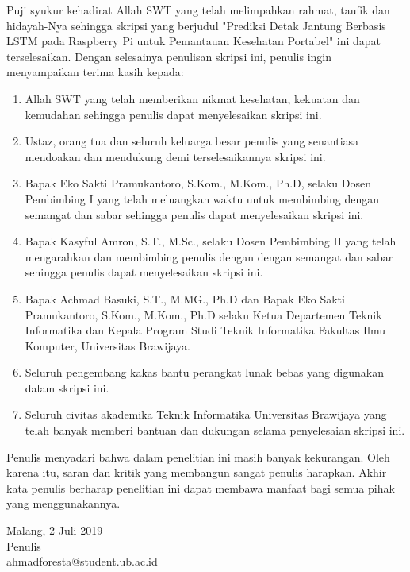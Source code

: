 \documentclass{skripsi}
\begin{document}
{\preface

  Puji syukur kehadirat Allah SWT yang telah melimpahkan rahmat,
  taufik dan hidayah-Nya sehingga skripsi yang berjudul 
  "Prediksi Detak Jantung Berbasis LSTM pada Raspberry Pi untuk
  Pemantauan Kesehatan Portabel" ini dapat terselesaikan. Dengan
  selesainya penulisan skripsi ini, penulis ingin menyampaikan terima kasih
  kepada:

  \begin{singlespace}
    \begin{enumerate}
  \item{Allah SWT yang telah memberikan nikmat kesehatan, kekuatan dan
      kemudahan sehingga penulis dapat menyelesaikan skripsi ini.}
  \item{Ustaz, orang tua dan seluruh keluarga besar penulis yang
      senantiasa mendoakan dan mendukung demi terselesaikannya skripsi
      ini.}
  \item{Bapak Eko Sakti Pramukantoro, S.Kom., M.Kom., Ph.D, selaku Dosen Pembimbing I
      yang telah meluangkan waktu untuk membimbing dengan semangat dan
      sabar sehingga penulis dapat menyelesaikan skripsi ini.}
  \item{Bapak Kasyful Amron, S.T., M.Sc., selaku
      Dosen Pembimbing II yang telah mengarahkan dan membimbing
      penulis dengan dengan semangat dan sabar sehingga penulis dapat
      menyelesaikan skripsi ini.}
  \item {Bapak Achmad Basuki, S.T., M.MG., Ph.D dan Bapak Eko Sakti Pramukantoro, S.Kom., M.Kom., Ph.D selaku Ketua Departemen Teknik Informatika
      dan Kepala Program Studi Teknik Informatika Fakultas Ilmu
      Komputer, Universitas Brawijaya.}
  \item{Seluruh pengembang kakas bantu perangkat lunak bebas yang
      digunakan dalam skripsi ini.}
  \item{Seluruh civitas akademika Teknik Informatika Universitas
      Brawijaya yang telah banyak memberi bantuan dan dukungan selama
      penyelesaian skripsi ini.}
  \end{enumerate}
  \end{singlespace}

  Penulis menyadari bahwa dalam penelitian ini masih banyak
  kekurangan. Oleh karena itu, saran dan kritik yang membangun sangat
  penulis harapkan. Akhir kata penulis berharap penelitian ini dapat
  membawa manfaat bagi semua pihak yang menggunakannya.

  \vspace{0.8cm}

  \noindent
  \hspace*{8cm}Malang, 2 Juli 2019  
  \vspace{1.5cm} \\
  \hspace*{8cm}Penulis \\
  \hspace*{8cm}ahmadforesta@student.ub.ac.id
}
\end{document}
